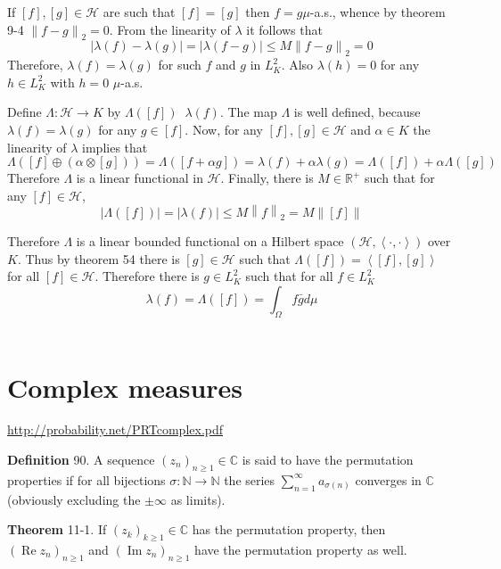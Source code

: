 \documentclass[a4paper]{article}
\newcommand{\clo}[1]{\left [ #1 \right ]}
\newcommand{\brac}[1]{\left ( #1 \right )}
\newcommand{\abs}[1]{\left | #1 \right |}
\newcommand{\nrm}[1]{\left\| #1 \right \|}
\newcommand{\brkt}[1]{\left\langle #1 \right\rangle}
\newcommand{\Real}{\mathbb{R}}
\newcommand{\Cplx}{\mathbb{C}}
\newcommand{\Hcal}{\mathcal{H}}
\newcommand{\defn}{\mathop{\overset{\Delta}{=}}\nolimits}
\newcommand{\re}{\operatorname{Re}\nolimits}
\newcommand{\im}{\operatorname{Im}\nolimits}
\begin{document}
If $\clo{f}, \clo{g}\in \Hcal$ are such that $\clo{f}=\clo{g}$ then $f=g$$\mu$-a.s., whence by theorem 9-4 $\nrm{f-g}_2=0$. From the linearity of $\lambda$ it follows that \[\abs{\lambda\brac{f}-\lambda\brac{g}} = \abs{\lambda\brac{f-g}}\leq M\nrm{f-g}_2 = 0\] Therefore, $\lambda\brac{f}=\lambda\brac{g}$ for such $f$ and $g$ in $L^2_K$. Also $\lambda\brac{h}=0$ for any $h\in L^2_K$ with $h=0$ $\mu$-a.s.

Define $\Lambda:\Hcal\to K$ by $\Lambda\brac{\clo{f}}\defn \lambda\brac{f}$. The map $\Lambda$ is well defined, because $\lambda\brac{f}=\lambda\brac{g}$ for any $g\in \clo{f}$. Now, for any $\clo{f}, \clo{g}\in \Hcal$ and $\alpha\in K$ the linearity of $\lambda$ implies that\[\Lambda\brac{\clo{f}\oplus\brac{\alpha\otimes\clo{g}}} = \Lambda\brac{\clo{f+\alpha g}} = \lambda\brac{f}+\alpha\lambda\brac{g} = \Lambda\brac{\clo{f}}+\alpha \Lambda\brac{\clo{g}}\] Therefore $\Lambda$ is a linear functional in $\Hcal$. Finally, there is $M\in \Real^+$ such that for any $\clo{f}\in \Hcal$, \[\abs{\Lambda\brac{\clo{f}}}=\abs{\lambda\brac{f}}\leq M\nrm{f}_2 = M\nrm{\clo{f}}\]

Therefore $\Lambda$ is a linear bounded functional on a Hilbert space $\brac{\Hcal, \brkt{\cdot,\cdot}}$ over $K$. Thus by theorem 54 there is $\clo{g}\in \Hcal$ such that $\Lambda\brac{\clo{f}}=\brkt{\clo{f},\clo{g}}$ for all $\clo{f}\in \Hcal$. Therefore there is $g\in L^2_K$ such that for all $f\in L^2_K$ \[\lambda\brac{f} = \Lambda\brac{\clo{f}}=\int_\Omega f\bar{g} d\mu\]\\


\section{Complex measures} %
\label{sec:tut_11}
\url{http://probability.net/PRTcomplex.pdf}

\noindent \textbf{Definition} 90.
A sequence $\brac{z_n}_{n\geq 1}\in\Cplx$ is said to have the permutation properties if for all bijections $\sigma:\mathbb{N}\to\mathbb{N}$ the series $\sum_{n=1}^\infty a_{\sigma\brac{n}}$ converges in $\Cplx$ (obviously excluding the $\pm\infty$ as limits).

\label{thm:absolute_summation_1} \noindent \textbf{Theorem} 11-1.
If $\brac{z_k}_{k\geq1}\in \Cplx$ has the permutation property, then $\brac{\re z_n}_{n\geq 1}$ and $\brac{\im z_n}_{n\geq 1}$ have the permutation property as well.
\end{document}
